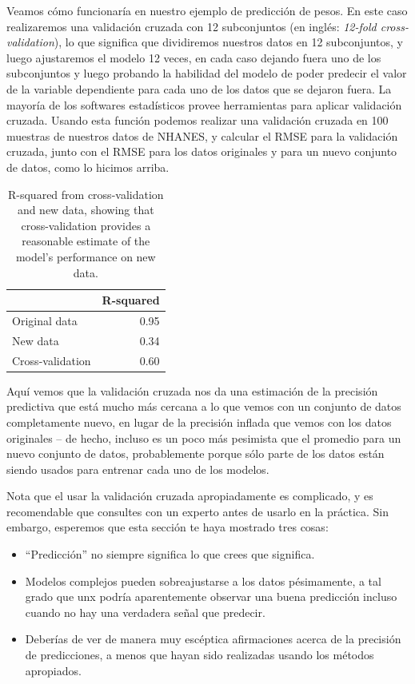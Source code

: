 \documentclass[
  12pt,
]{book}
\providecommand{\tightlist}{%
  \setlength{\itemsep}{0pt}\setlength{\parskip}{0pt}}
\begin{document}
Veamos cómo funcionaría en nuestro ejemplo de predicción de pesos. En este caso realizaremos una validación cruzada con 12 subconjuntos (en inglés: \emph{12-fold cross-validation}), lo que significa que dividiremos nuestros datos en 12 subconjuntos, y luego ajustaremos el modelo 12 veces, en cada caso dejando fuera uno de los subconjuntos y luego probando la habilidad del modelo de poder predecir el valor de la variable dependiente para cada uno de los datos que se dejaron fuera. La mayoría de los softwares estadísticos provee herramientas para aplicar validación cruzada. Usando esta función podemos realizar una validación cruzada en 100 muestras de nuestros datos de NHANES, y calcular el RMSE para la validación cruzada, junto con el RMSE para los datos originales y para un nuevo conjunto de datos, como lo hicimos arriba.

\begin{table}

\caption{\label{tab:unnamed-chunk-103}R-squared from cross-validation and new data, showing that cross-validation provides a reasonable estimate of the model's performance on new data.}
\centering
\begin{tabular}[t]{l|r}
\hline
  & R-squared\\
\hline
Original data & 0.95\\
\hline
New data & 0.34\\
\hline
Cross-validation & 0.60\\
\hline
\end{tabular}
\end{table}

Aquí vemos que la validación cruzada nos da una estimación de la precisión predictiva que está mucho más cercana a lo que vemos con un conjunto de datos completamente nuevo, en lugar de la precisión inflada que vemos con los datos originales -- de hecho, incluso es un poco más pesimista que el promedio para un nuevo conjunto de datos, probablemente porque sólo parte de los datos están siendo usados para entrenar cada uno de los modelos.

Nota que el usar la validación cruzada apropiadamente es complicado, y es recomendable que consultes con un experto antes de usarlo en la práctica. Sin embargo, esperemos que esta sección te haya mostrado tres cosas:

\begin{itemize}
\tightlist
\item
  ``Predicción'' no siempre significa lo que crees que significa.
\item
  Modelos complejos pueden sobreajustarse a los datos pésimamente, a tal grado que unx podría aparentemente observar una buena predicción incluso cuando no hay una verdadera señal que predecir.
\item
  Deberías de ver de manera muy escéptica afirmaciones acerca de la precisión de predicciones, a menos que hayan sido realizadas usando los métodos apropiados.
\end{itemize}
\end{document}
